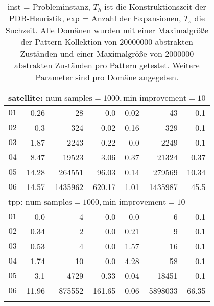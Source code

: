 \begin{longtable}{|c||r|r|r||r|r|r|}
\multicolumn{7}{|l|}{satellite: $\text{num-samples}=1000,\text{min-improvement}=10$}\\\hline
$01$ & 0.26 & 28 & 0.0 & 0.02 & 43 & 0.1 \\\hline
$02$ & 0.3 & 324 & 0.02 & 0.16 & 329 & 0.1 \\\hline
$03$ & 1.87 & 2243 & 0.22 & 0.0 & 2249 & 0.1 \\\hline
$04$ & 8.47 & 19523 & 3.06 & 0.37 & 21324 & 0.37 \\\hline
$05$ & 14.28 & 264551 & 96.03 & 0.14 & 279569 & 10.34 \\\hline
$06$ & 14.57 & 1435962 & 620.17 & 1.01 & 1435987 & 45.5 \\\hline

\multicolumn{7}{|l|}{tpp: $\text{num-samples}=1000,\text{min-improvement}=10$}\\\hline
$01$ & 0.0 & 4 & 0.0 & 0.0 & 6 & 0.1 \\\hline
$02$ & 0.34 & 2 & 0.0 & 0.21 & 9 & 0.1 \\\hline
$03$ & 0.53 & 4 & 0.0 & 1.57 & 16 & 0.1 \\\hline
$04$ & 1.74 & 10 & 0.0 & 4.28 & 58 & 0.1 \\\hline
$05$ & 3.1 & 4729 & 0.33 & 0.04 & 18451 & 0.1 \\\hline
$06$ & 11.96 & 875552 & 161.65 & 0.06 & 5898033 & 66.35 \\\hline


\caption{inst = Probleminstanz, $T_h$ ist die Konstruktionszeit der PDB-Heuristik, exp = Anzahl der Expansionen, $T_s$
die Suchzeit. Alle Domänen wurden mit einer Maximalgröße der Pattern-Kollektion von $20000000$ abstrakten Zuständen und 
einer Maximalgröße von $2000000$ abstrakten Zuständen pro Pattern getestet. Weitere Parameter sind pro Domäne angegeben.}
\end{longtable}